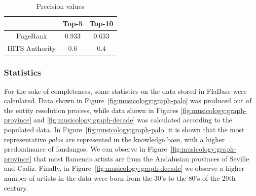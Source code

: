 

\begin{table}[!ht]
    \centering
    \begin{tabular}{|c|c|c|}
    \hline
    & Top-5 & Top-10 \\
    \hline
    PageRank & 0.933 & 0.633 \\
    HITS Authority & 0.6 & 0.4 \\
    \hline
    \end{tabular}
    \caption{Precision values}    
    \label{tbl:musicology:experts_results}
\end{table}

\subsubsection{Statistics}

For the sake of completeness, some statistics on the data stored in FlaBase were calculated. 
 Data shown in Figure~\ref{fig:musicology:graph-palo} was produced out of the entity resolution process, while data shown in Figures \ref{fig:musicology:graph-province} and \ref{fig:musicology:graph-decade} was calculated according to the populated data. In Figure~\ref{fig:musicology:graph-palo} it is shown that the most representative \textit{palos} are represented in the knowledge base, with a higher predominance of fandangos. We can observe in Figure~\ref{fig:musicology:graph-province} that most flamenco artists are from the Andalusian provinces of Seville and Cadiz. 
Finally, in Figure~\ref{fig:musicology:graph-decade} we observe a higher number of artists in the data were born from the 30's to the 80's of the 20th century.


